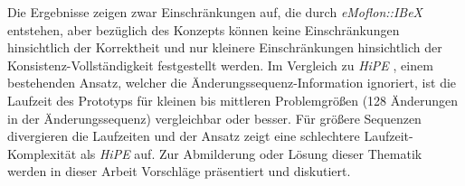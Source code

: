Die Ergebnisse zeigen zwar Einschränkungen auf, die durch \emph{eMoflon::IBeX} entstehen, aber bezüglich des Konzepts können keine Einschränkungen hinsichtlich der Korrektheit und nur kleinere Einschränkungen hinsichtlich der Konsistenz-Vollständigkeit festgestellt werden. Im Vergleich zu \emph{HiPE} \cite{hipe-devops_highly_2022}, einem bestehenden Ansatz, welcher die Änderungssequenz-Information ignoriert, ist die Laufzeit des Prototyps für kleinen bis mittleren Problemgrößen (128 Änderungen in der Änderungssequenz) vergleichbar oder besser. Für größere Sequenzen divergieren die Laufzeiten und der Ansatz zeigt eine schlechtere Laufzeit-Komplexität als \emph{HiPE} auf. Zur Abmilderung oder Lösung dieser Thematik werden in dieser Arbeit Vorschläge präsentiert und diskutiert.

